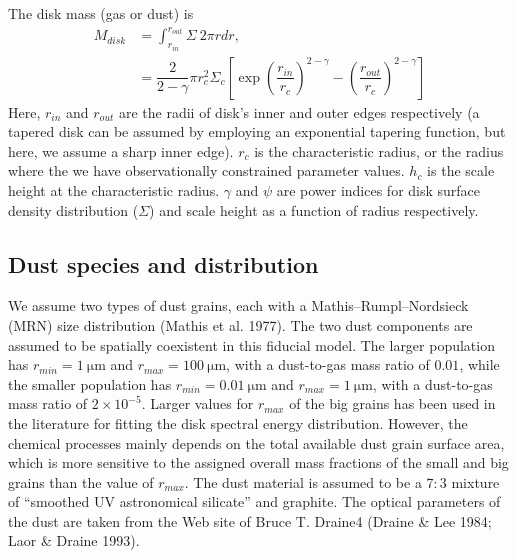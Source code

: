 The disk mass (gas or dust) is
\begin{equation}
	\begin{split}
		M_{disk} &= \int_{r_{in}}^{r_{out}} \Sigma \: 2 \pi r dr, \\
		&= \dfrac{2}{2-\gamma} \pi r_c^2 \Sigma_c \left[\exp \left(\dfrac{r_{in}}{r_c}\right)^{2-\gamma}-\left(\dfrac{r_{out}}{r_c}\right)^{2-\gamma}\right]
	\end{split}
\end{equation}
Here, $r_{in}$ and $r_{out}$ are the radii of disk's inner and outer edges respectively (a tapered disk can be assumed by employing an exponential tapering function, but here, we assume a sharp inner edge). $r_c$ is the characteristic radius, or the radius where the we have observationally constrained parameter values.
$h_c$ is the scale height at the characteristic radius. $\gamma$ and $\psi$ are power indices for disk surface density distribution ($\Sigma$) and scale height as a function of radius respectively.

\subsection{Dust species and distribution}
We assume two types of dust grains, each with a Mathis–Rumpl–Nordsieck (MRN) size distribution (Mathis et al. 1977). The two dust components are assumed to be spatially coexistent in this fiducial model. The larger population has $r_{min} = \SI{1}{\micro \meter}$ and $r_{max} = \SI{100}{\micro \meter}$, with a dust-to-gas mass ratio of $0.01$, while the smaller population has $r_{min} = \SI{0.01}{\micro \meter}$ and $r_{max} = \SI{1}{\micro \meter}$, with a dust-to-gas mass ratio of $2 \times 10^{-5}$. Larger values for $r_{max}$ of the big grains has been used in the literature for fitting the disk spectral energy distribution. However, the chemical processes mainly depends on the total available dust grain surface area, which is more sensitive to the assigned overall mass fractions of the small and big grains than the value of $r_{max}$. The dust material is assumed to be a $7:3$ mixture of ``smoothed UV astronomical silicate'' and graphite. The optical parameters of the dust are taken from the Web site of Bruce T. Draine4 (Draine \& Lee 1984; Laor \& Draine 1993).
